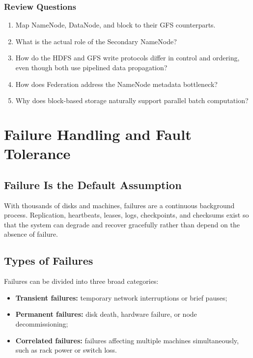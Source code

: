 \documentclass[11pt,a4paper,oneside]{book}
\begin{document}
\subsubsection*{Review Questions}
\begin{enumerate}
    \item Map NameNode, DataNode, and block to their GFS counterparts.
    \item What is the actual role of the Secondary NameNode?
    \item How do the HDFS and GFS write protocols differ in control and ordering, even though both use pipelined data propagation?
    \item How does Federation address the NameNode metadata bottleneck?
    \item Why does block-based storage naturally support parallel batch computation?
\end{enumerate}


\section{Failure Handling and Fault Tolerance}

\subsection{Failure Is the Default Assumption}

With thousands of disks and machines, failures are a continuous background process. Replication, heartbeats, leases, logs, checkpoints, and checksums exist so that the system can degrade and recover gracefully rather than depend on the absence of failure.

\subsection{Types of Failures}

Failures can be divided into three broad categories:

\begin{itemize}
    \item \textbf{Transient failures:} temporary network interruptions or brief pauses;
    \item \textbf{Permanent failures:} disk death, hardware failure, or node decommissioning;
    \item \textbf{Correlated failures:} failures affecting multiple machines simultaneously, such as rack power or switch loss.
\end{itemize}
\end{document}

